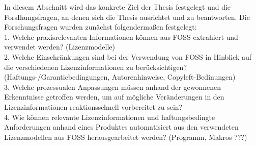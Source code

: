 In diesem Abschnitt wird das konkrete Ziel der Thesis festgelegt und die ForsIhungsfragen, an denen sich die Thesis ausrichtet und zu beantworten. Die Forschungsfragen wurden zunächst folgendermaßen festgelegt: \\


1. Welche praxisrelevanten Informationen können aus FOSS extrahiert und verwendet werden? (Lizenzmodelle)\\



2. Welche Einschränkungen sind bei der Verwendung von FOSS in Hinblick auf die verschiedenen Lizenzinformationen zu berücksichtigen? (Haftungs-/Garantiebedingungen, Autorenhinweise, Copyleft-Bedinungen)\\



3. Welche prozessualen Anpassungen müssen anhand der gewonnenen Erkenntnisse getroffen werden, um auf mögliche Veränderungen in den Lizenzinformationen reaktionsschnell vorbereitet zu sein?\\ 








4. Wie können relevante Lizenzinformationen und haftungsbedingte Anforderungen anhand eines Produktes automatisiert aus den verwendeten Lizenzmodellen aus FOSS herausgearbeitet werden? (Programm, Makros ???)\\

